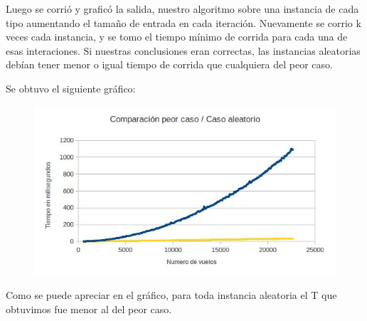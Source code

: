 Luego se corri\'o y grafic\'o la salida, nuestro algoritmo sobre una instancia de cada tipo aumentando el tamaño de entrada en cada iteraci\'on. Nuevamente se corrio k veces cada instancia, y se tomo el tiempo m\'inimo de corrida para cada una de esas interaciones. Si nuestras conclusiones eran correctas, las instancias aleatorias deb\'ian tener menor o igual tiempo de corrida que cualquiera del peor caso.

Se obtuvo el siguiente gr\'afico:

\begin{figure}[ht]
	\begin{minipage}[t]{\linewidth}
		\centering
		\includegraphics[width=\textwidth]{comparacionVuelosPeorAleatorio.jpg}
	\end{minipage}	
\end{figure}


Como se puede apreciar en el gr\'afico, para toda instancia aleatoria el T que obtuvimos fue menor al del peor caso.